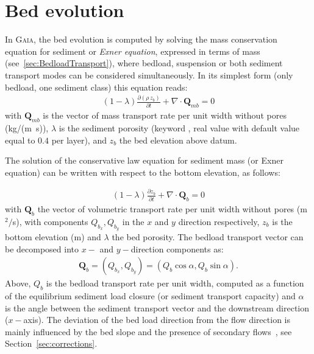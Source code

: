\pagebreak
\section{Bed evolution}\label{sec:bedevol}

In \textsc{Gaia}, the bed evolution is computed by solving the mass conservation equation for sediment or \textit{Exner equation}, expressed in terms of mass (see~\ref{sec:BedloadTransport}), where bedload, suspension or both sediment transport modes can be considered simultaneously. In its simplest form (only bedload, one sediment class) this equation reads:
\begin{align}
  (1-\lambda)\frac{\partial (\rho\,z_b)}{\partial t} + \nabla\cdot\mathbf{Q}_{mb}=0
\end{align}
with $\mathbf Q_{mb}$ is the vector of mass transport rate per unit width without pores (kg/(m~s)), $\lambda$ is the sediment porosity (keyword , real value with default value equal to $0.4$ per layer), and $z_b$ the bed elevation above datum.

The solution of the conservative law equation for sediment mass (or Exner equation) can be written with respect to the bottom elevation, as follows:

\begin{align}
(1-\lambda)\frac{\partial z_b}{\partial t} + \nabla\cdot \mathbf Q_b = 0
\label{eq:Exner}
\end{align}
with $\mathbf Q_b$ the vector of volumetric transport rate per unit width without pores (m$^2/$s), with components $Q_{b_x}, Q_{b_y}$ in the $x$ and $y$ direction respectively, $z_b$ is the bottom elevation (m) and $\lambda$ the bed porosity. The bedload transport vector can be decomposed into $x-$ and $y-$direction components as:
\begin{align}
\mathbf Q_b = (Q_{b_x}, Q_{b_y}) = (Q_b \cos\alpha, Q_b \sin\alpha).
\label{eq:bedloadtransportvector}
\end{align}
Above, $Q_b$ is the bedload transport rate per unit width, computed as a function of the equilibrium sediment load closure (or sediment transport capacity) and $\alpha$ is the angle between the sediment transport vector and the downstream direction ($x-$axis).
The deviation of the bed load direction from the flow direction is mainly influenced by the bed slope and the presence of secondary flows~\cite{Talmon95}, see Section~\ref{sec:corrections}.

